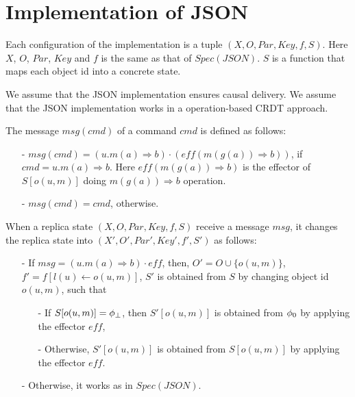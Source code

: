 



\section{Implementation of JSON}
\label{sec:implementation of json}

Each configuration of the implementation is a tuple $(X,O,Par,Key,f,S)$. Here $X$, $O$, $Par$, $Key$ and $f$ is the same as that of $\mathit{Spec}(\mathit{JSON})$. $S$ is a function that maps each object id into a concrete state. 

We assume that the JSON implementation ensures causal delivery. We assume that the JSON implementation works in a operation-based CRDT approach. 

The message $\mathit{msg}(\mathit{cmd})$ of a command $\mathit{cmd}$ is defined as follows: 

\begin{itemize}
\setlength{\itemsep}{0.5pt}
\item[-] $\mathit{msg}(\mathit{cmd}) = ( u.m(a)\Rightarrow b ) \cdot ( \mathit{eff}( m( g(a) )\Rightarrow b ) )$, if $\mathit{cmd} = u.m(a)\Rightarrow b$. Here $\mathit{eff}( m( g(a) )\Rightarrow b )$ is the effector of $S[o(u,m)]$ doing $m(g(a))\Rightarrow b$ operation. 

\item[-] $\mathit{msg}(\mathit{cmd}) = \mathit{cmd}$, otherwise. 
\end{itemize}

When a replica state $(X,O,Par,Key,f,S)$ receive a message $\mathit{msg}$, it changes the replica state into $(X',O',Par',Key',f',S')$ as follows: 

\begin{itemize}
\setlength{\itemsep}{0.5pt}
\item[-] If $\mathit{msg} = ( u.m(a)\Rightarrow b ) \cdot \mathit{eff}$, then, $O' = O \cup \{ o(u,m) \}$, $f' = f[l(u) \leftarrow o(u,m)]$, $S'$ is obtained from $S$ by changing object id $o(u,m)$, such that 
    
    \begin{itemize}
    \setlength{\itemsep}{0.5pt} 
    \item[-] If $S[o(u,m)] = \phi_{\bot}$, then $S'[o(u,m)]$ is obtained from $\phi_0$ by applying the effector $\mathit{eff}$, 
    
    \item[-] Otherwise, $S'[o(u,m)]$ is obtained from $S[o(u,m)]$ by applying the effector $\mathit{eff}$. 
    \end{itemize} 

\item[-] Otherwise, it works as in $\mathit{Spec}(\mathit{JSON})$. 
\end{itemize}






